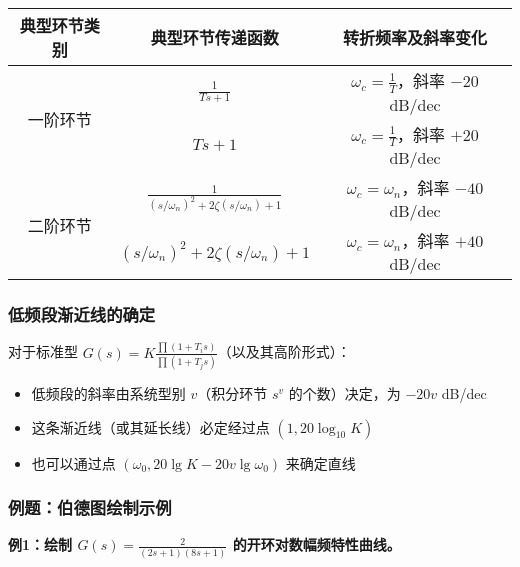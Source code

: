 \begin{center}
\begin{tabular}{|c|c|c|}
\hline
\textbf{典型环节类别} & \textbf{典型环节传递函数} & \textbf{转折频率及斜率变化} \\
\hline
\multirow{2}{*}{一阶环节} & $\displaystyle\frac{1}{Ts+1}$ & $\omega_c = \frac{1}{T}$，斜率 $-20$ dB/dec \\
\cline{2-3}
& $Ts+1$ & $\omega_c = \frac{1}{T}$，斜率 $+20$ dB/dec \\
\hline
\multirow{2}{*}{二阶环节} & $\displaystyle\frac{1}{(s/\omega_n)^2+2\zeta(s/\omega_n)+1}$ & $\omega_c = \omega_n$，斜率 $-40$ dB/dec \\
\cline{2-3}
& $(s/\omega_n)^2+2\zeta(s/\omega_n)+1$ & $\omega_c = \omega_n$，斜率 $+40$ dB/dec \\
\hline
\end{tabular}
\end{center}

\subsubsection{低频段渐近线的确定}

对于标准型 $G(s) = K \frac{\prod(1+T_i s)}{\prod(1+T_j s)}$（以及其高阶形式）：
\begin{itemize}
    \item 低频段的斜率由系统型别 $v$（积分环节 $s^v$ 的个数）决定，为 $-20v$ dB/dec
    \item 这条渐近线（或其延长线）必定经过点 $(1, 20\log_{10}K)$
    \item 也可以通过点 $(\omega_0, 20\lg K - 20v\lg\omega_0)$ 来确定直线
\end{itemize}

\subsubsection{例题：伯德图绘制示例}

\textbf{例1：绘制 $G(s) = \frac{2}{(2s+1)(8s+1)}$ 的开环对数幅频特性曲线。}

